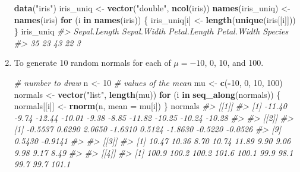 \documentclass[]{book}
\newenvironment{Shaded}{\begin{snugshade}}{\end{snugshade}}
\newcommand{\CommentTok}[1]{\textcolor[rgb]{0.56,0.35,0.01}{\textit{#1}}}
\newcommand{\ControlFlowTok}[1]{\textcolor[rgb]{0.13,0.29,0.53}{\textbf{#1}}}
\newcommand{\DataTypeTok}[1]{\textcolor[rgb]{0.13,0.29,0.53}{#1}}
\newcommand{\DecValTok}[1]{\textcolor[rgb]{0.00,0.00,0.81}{#1}}
\newcommand{\KeywordTok}[1]{\textcolor[rgb]{0.13,0.29,0.53}{\textbf{#1}}}
\newcommand{\NormalTok}[1]{#1}
\newcommand{\OperatorTok}[1]{\textcolor[rgb]{0.81,0.36,0.00}{\textbf{#1}}}
\newcommand{\StringTok}[1]{\textcolor[rgb]{0.31,0.60,0.02}{#1}}
\theoremstyle{plain}
\theoremstyle{remark}
\begin{document}
\begin{enumerate}
\begin{Shaded}
\begin{Highlighting}[]
\KeywordTok{data}\NormalTok{(}\StringTok{"iris"}\NormalTok{)}
\NormalTok{iris_uniq <-}\StringTok{ }\KeywordTok{vector}\NormalTok{(}\StringTok{"double"}\NormalTok{, }\KeywordTok{ncol}\NormalTok{(iris))}
\KeywordTok{names}\NormalTok{(iris_uniq) <-}\StringTok{ }\KeywordTok{names}\NormalTok{(iris)}
\ControlFlowTok{for}\NormalTok{ (i }\ControlFlowTok{in} \KeywordTok{names}\NormalTok{(iris)) \{}
\NormalTok{  iris_uniq[i] <-}\StringTok{ }\KeywordTok{length}\NormalTok{(}\KeywordTok{unique}\NormalTok{(iris[[i]]))}
\NormalTok{\}}
\NormalTok{iris_uniq}
\CommentTok{#> Sepal.Length  Sepal.Width Petal.Length  Petal.Width      Species }
\CommentTok{#>           35           23           43           22            3}
\end{Highlighting}
\end{Shaded}
\item
  To generate 10 random normals for each of \(\mu = -10\), 0, 10, and 100.

\begin{Shaded}
\begin{Highlighting}[]
\CommentTok{# number to draw}
\NormalTok{n <-}\StringTok{ }\DecValTok{10}
\CommentTok{# values of the mean}
\NormalTok{mu <-}\StringTok{ }\KeywordTok{c}\NormalTok{(}\OperatorTok{-}\DecValTok{10}\NormalTok{, }\DecValTok{0}\NormalTok{, }\DecValTok{10}\NormalTok{, }\DecValTok{100}\NormalTok{)}
\NormalTok{normals <-}\StringTok{ }\KeywordTok{vector}\NormalTok{(}\StringTok{"list"}\NormalTok{, }\KeywordTok{length}\NormalTok{(mu))}
\ControlFlowTok{for}\NormalTok{ (i }\ControlFlowTok{in} \KeywordTok{seq_along}\NormalTok{(normals)) \{}
\NormalTok{  normals[[i]] <-}\StringTok{ }\KeywordTok{rnorm}\NormalTok{(n, }\DataTypeTok{mean =}\NormalTok{ mu[i])}
\NormalTok{\}}
\NormalTok{normals}
\CommentTok{#> [[1]]}
\CommentTok{#>  [1] -11.40  -9.74 -12.44 -10.01  -9.38  -8.85 -11.82 -10.25 -10.24 -10.28}
\CommentTok{#> }
\CommentTok{#> [[2]]}
\CommentTok{#>  [1] -0.5537  0.6290  2.0650 -1.6310  0.5124 -1.8630 -0.5220 -0.0526}
\CommentTok{#>  [9]  0.5430 -0.9141}
\CommentTok{#> }
\CommentTok{#> [[3]]}
\CommentTok{#>  [1] 10.47 10.36  8.70 10.74 11.89  9.90  9.06  9.98  9.17  8.49}
\CommentTok{#> }
\CommentTok{#> [[4]]}
\CommentTok{#>  [1] 100.9 100.2 100.2 101.6 100.1  99.9  98.1  99.7  99.7 101.1}
\end{Highlighting}
\end{Shaded}
\end{enumerate}
\end{document}
